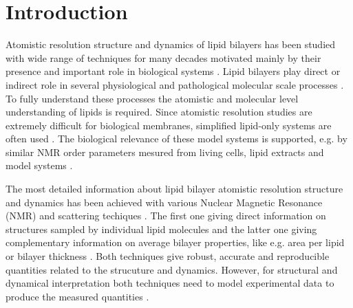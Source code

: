 \documentclass[aps,prl,superscriptaddress,twocolumn]{revtex4}
\begin{document}

\maketitle %



\section{Introduction}
Atomistic resolution structure and dynamics of lipid bilayers has been studied
with wide range of techniques for many decades motivated mainly
by their presence and important role in biological systems \cite{israelachvili80,jacobs81,davis83,bloom91,nagle00,??}.
Lipid bilayers play direct or indirect role in several physiological and pathological
molecular scale processes \cite{lee04,kinnunen09,??}. To fully understand these processes the atomistic and
molecular level understanding of lipids is required. Since atomistic resolution studies are
extremely difficult for biological membranes, simplified lipid-only systems are often used \cite{??}.
The biological relevance of these model systems is supported, e.g. by similar NMR order parameters 
mesured from living cells, lipid extracts and model systems \cite{??}. 

The most detailed information about lipid bilayer atomistic resolution structure and dynamics has been
achieved with various Nuclear Magnetic Resonance (NMR) and scattering techiques \cite{jacobs81,davis83,bloom91,nagle00,pabst10,kucerka11,marquardt15}. 
The first one giving direct information on structures sampled by individual lipid molecules \cite{jacobs81,davis83,bloom91,??} and
the latter one giving complementary information on average bilayer properties, like e.g. area per lipid or bilayer thickness \cite{nagle00,pabst10,kucerka11,marquardt15}.
Both techniques give robust, accurate and reproducible quantities related to the strucuture and dynamics.
However, for structural and dynamical interpretation both techniques need to model experimental data to produce 
the measured quantities \cite{jacobs81,davis83,bloom91,nagle00,pabst10,kucerka11,marquardt15}. 
\end{document}
